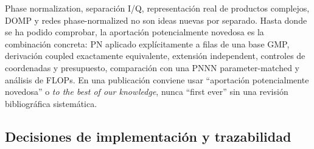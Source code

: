 \documentclass[10pt,a4paper]{article}
\begin{document}
Phase normalization, separación I/Q, representación real de productos
complejos, DOMP y redes phase-normalized no son ideas nuevas por separado. Hasta
donde se ha podido comprobar, la aportación potencialmente novedosa es la
combinación concreta: PN aplicado explícitamente a filas de una base GMP,
derivación coupled exactamente equivalente, extensión independent, controles de
coordenadas y presupuesto, comparación con una PNNN parameter-matched y análisis
de FLOPs. En una publicación conviene usar ``aportación potencialmente novedosa''
o \emph{to the best of our knowledge}, nunca ``first ever'' sin una revisión
bibliográfica sistemática.

\subsection{Decisiones de implementación y trazabilidad}
\end{document}

